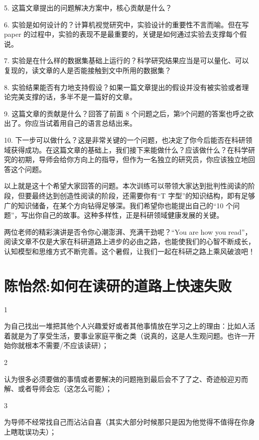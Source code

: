 5. 这篇文章提出的问题解决方案中，核心贡献是什么？



6. 实验是如何设计的？计算机视觉研究中，实验设计的重要性不言而喻。但在写 paper 的过程中，实验的表现不是最重要的，关键是如何通过实验去支撑每个假说。


7. 实验是在什么样的数据集基础上运行的？科学研究结果应当是可以量化、可以复现的，读文章的人是否能接触到文中所用的数据集？



8. 实验结果能否有力地支持假设？如果一篇文章提出的假设并没有被实验或者理论完美支撑的话，多半不是一篇好的文章。


9. 这篇文章的贡献是什么？回答了前面 8 个问题之后，第9个问题的答案也呼之欲出了。你应当试着用自己的语言总结出来。



10. 下一步可以做什么？这是非常关键的一个问题，也决定了你今后能否在科研领域获得成功。在这篇文章的基础上，我们接下来能做什么？应该做什么？在科学研究的初期，导师会给你方向上的指导，但作为一名独立的研究员，你应该独立地回答这个问题。



以上就是这十个希望大家回答的问题。本次训练可以带领大家达到批判性阅读的阶段，但要最终达到创造性阅读的阶段，还需要你有“T 字型”的知识结构，即有足够广的知识储备，在某个方向钻得足够深。我们希望你也能提出自己的“10 个问题”，写出你自己的故事。这种多样性，正是科研领域健康发展的关键。



两位老师的精彩演讲是否令你心潮澎湃、充满干劲呢？“You are how you read”，阅读文章不仅是大家在科研道路上进步的必由之路，也能使我们的心智不断成长，认知模型和思维方式不断完善。这个暑假，让我们一起在科研之路上乘风破浪吧！




\section{陈怡然:如何在读研的道路上快速失败}

1

为自己找出一堆把其他个人兴趣爱好或者其他事情放在学习之上的理由：比如人活着就是为了享受生活，要事业家庭平衡之类（说真的，这是人生观问题。也许一开始你就根本不需要/不应该读研）；

2

认为很多必须要做的事情或者要解决的问题拖到最后会不了了之、奇迹般迎刃而解、或者导师会忘（这怎么可能）；

3

为导师不经常找自己而沾沾自喜（其实大部分时候那只是因为他觉得不值得在你身上瞎耽误功夫）；

